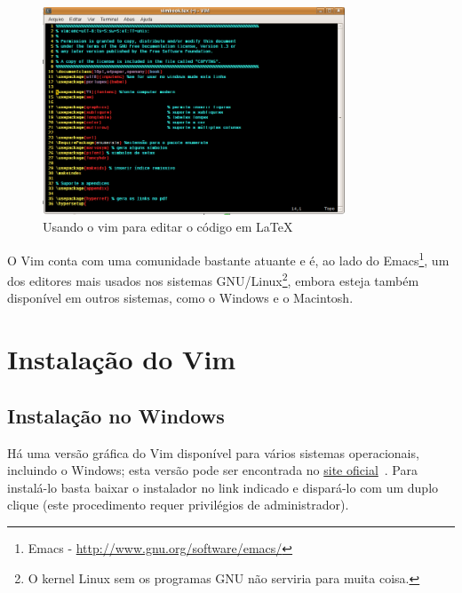 \begin{figure}[htp]
  \centering 
  \includegraphics[width=9cm]{img/vimedittex} %
  \caption{Usando o vim para editar o código em \LaTeX}
  \label{fig:vimedittex}
\end{figure}

O Vim conta com uma comunidade bastante atuante e é, ao lado do
Emacs\footnote{Emacs - \url{http://www.gnu.org/software/emacs/}}, um dos 
editores mais usados nos sistemas GNU/Linux\footnote{O kernel Linux sem os 
programas GNU não serviria para muita coisa.}, embora esteja também disponível
em outros sistemas, como o Windows e o Macintosh. 

\section{Instalação do Vim}
%
\subsection{Instalação no Windows}
%
Há uma versão gráfica do Vim disponível para vários sistemas operacionais, 
incluindo o Windows; esta versão pode ser encontrada no 
\href{http://www.vim.org/download.php}{site oficial}~\cite{SiteOficialDownloads}. 
Para instalá-lo basta baixar o instalador no link indicado e dispará-lo com um
duplo clique (este procedimento requer privilégios de administrador).

